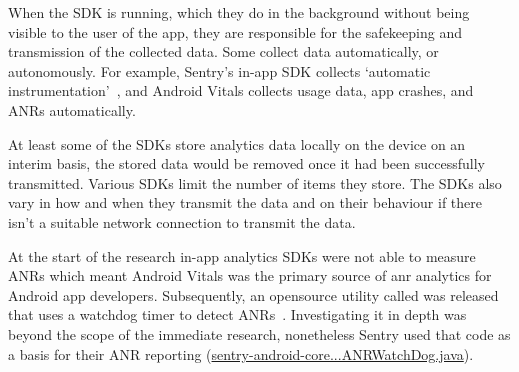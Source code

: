 When the SDK is running, which they do in the background without being visible to the user of the app, they are responsible for the safekeeping and transmission of the collected data. Some collect data automatically, or autonomously. For example, Sentry's in-app SDK collects `automatic instrumentation'~, and Android Vitals collects usage data, app crashes, and ANRs automatically.

At least some of the SDKs store analytics data locally on the device on an interim basis, the stored data would be removed once it had been successfully transmitted. Various SDKs limit the number of items they store. The SDKs also vary in how and when they transmit the data and on their behaviour if there isn't a suitable network connection to transmit the data.


At the start of the research in-app analytics SDKs were not able to measure ANRs which meant Android Vitals was the primary source of \Gls{anr} analytics for Android app developers. Subsequently, an opensource utility called  was released that uses a watchdog timer to detect ANRs~. 
Investigating it in depth was beyond the scope of the immediate research, nonetheless Sentry used that code as a basis for their ANR reporting (\href{https://github.com/getsentry/sentry-java/blob/3f8d7b1cc869bb056c9db99b459e43f6c375784a/sentry-android-core/src/main/java/io/sentry/android/core/ANRWatchDog.java}{sentry-android-core...ANRWatchDog.java}). 


